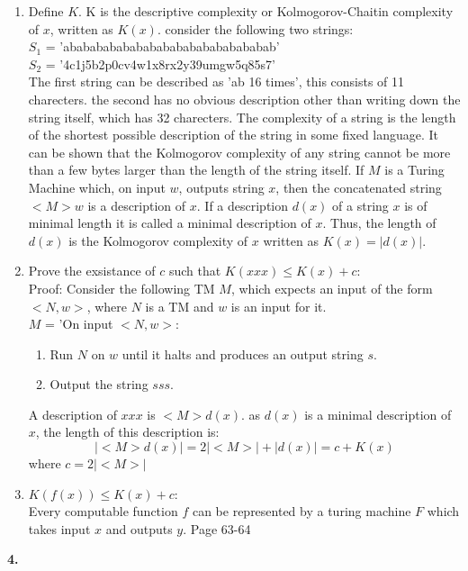 \documentclass[a4paper,12pt]{article}
\begin{document}
\begin{enumerate}[label=\alph*)]
\item Define $K$. K is the descriptive complexity or Kolmogorov-Chaitin complexity of $x$, written as $K(x)$. consider the following two strings: \\
$S_1$ = 'abababababababababababababababab'\\
$S_2$ = '4c1j5b2p0cv4w1x8rx2y39umgw5q85s7'\\
The first string can be described as 'ab 16 times', this consists of 11 charecters. the second has no obvious description other than writing down the string itself, which has 32 charecters. The complexity of a string is the length of the shortest possible description of the string in some fixed language. It can be shown that the Kolmogorov complexity of any string cannot be more than a few bytes larger than the length of the string itself. If $M$ is a Turing Machine which, on input $w$, outputs string $x$, then the concatenated string $<M> w$ is a description of $x$. If a description $d(x)$ of a string $x$ is of minimal length it is called a minimal description of $x$. Thus, the length of $d(x)$ is the Kolmogorov complexity of $x$ written as $K(x) = |d(x)|$.
\item Prove the exsistance of $c$ such that $K(xxx) \leq K(x)+c$: \\
Proof: Consider the following TM $M$, which expects an input of the form $<N, w>$, where $N$ is a TM and $w$ is an input for it. \\
$M$ = 'On input $<N, w>$:
\begin{enumerate}[label=\arabic*)]
\item Run $N$ on $w$ until it halts and produces an output string $s$.
\item Output the string $sss$.
\end{enumerate}
A description of $xxx$ is $<M>d(x)$. as $d(x)$ is a minimal description of $x$, the length of this description is:
$$|<M>d(x)| = 2|<M>| + |d(x)| = c + K(x)$$
where $c=2|<M>|$
\item $K(f(x)) \leq K(x) + c$: \\
Every computable function $f$ can be represented by a turing machine $F$ which takes input $x$ and outputs $y$. Page 63-64
\end{enumerate}
\noindent \textbf{4.}
\end{document}
